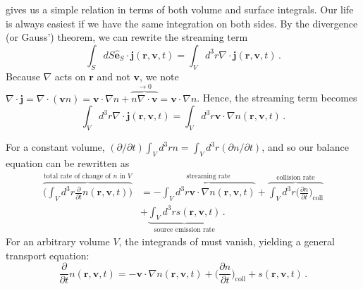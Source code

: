  gives us a simple relation in terms of both volume and surface integrals.  Our life is always easiest if we have the same integration on both sides.  By the divergence (or Gauss') theorem, we can rewrite the streaming term
\begin{equation}
 \int_S dS \mathbf{\hat{e}}_S \cdot \mathbf{j}(\mathbf{r},\mathbf{v},t) = \int_V d^3r \nabla \cdot \mathbf{j}(\mathbf{r},\mathbf{v},t) \, .
\end{equation}
Because $\nabla$ acts on $\mathbf{r}$ and not $\mathbf{v}$, we note $ \nabla \cdot \mathbf{j} = \nabla \cdot (\mathbf{v} n) =  \mathbf{v} \cdot \nabla n + \overbrace{ n \nabla \cdot \mathbf{v}}^{\to 0} = \mathbf{v} \cdot \nabla n$.  Hence, the streaming term becomes
\begin{equation}
 \int_V d^3r \nabla \cdot \mathbf{j}(\mathbf{r},\mathbf{v},t) = \int_V d^3r \mathbf{v} \cdot \nabla n(\mathbf{r},\mathbf{v},t) \, .
\end{equation}

For a constant volume, $(\partial/\partial t) \int_V d^3 r n = \int_V d^3 r (\partial n/\partial t)$, and so our balance equation can be rewritten as
\begin{equation}
\begin{split}
 \overbrace{  \Bigg ( \int_V d^3 r \frac{\partial}{\partial t}n(\mathbf{r},\mathbf{v},t) \Bigg ) }^{\text{total rate of change of }n\text{ in } V} 
      &=  - \overbrace{\int_V d^3r \mathbf{v} \cdot \nabla n(\mathbf{r},\mathbf{v},t)}^{\text{streaming rate}}
       + \overbrace{ \int_V d^3 r \Big( \frac{\partial n}{\partial t} \Big )_{\mathrm{coll}} }^{\text{collision rate}} \\
      &+ \underbrace{ \int_V d^3 r s(\mathbf{r},\mathbf{v},t) }_{\text{source emission rate}}  \, .
\end{split}
\label{eq:balance2}
\end{equation}
For an arbitrary volume $V$, the integrands of  must vanish, yielding a general transport equation:
\begin{equation}
  \frac{\partial}{\partial t}n(\mathbf{r},\mathbf{v},t) = -\mathbf{v} \cdot \nabla n(\mathbf{r},\mathbf{v},t) + \Big( \frac{\partial n}{\partial t} \Big )_{\mathrm{coll}} +  s(\mathbf{r},\mathbf{v},t) \, .
\end{equation}

